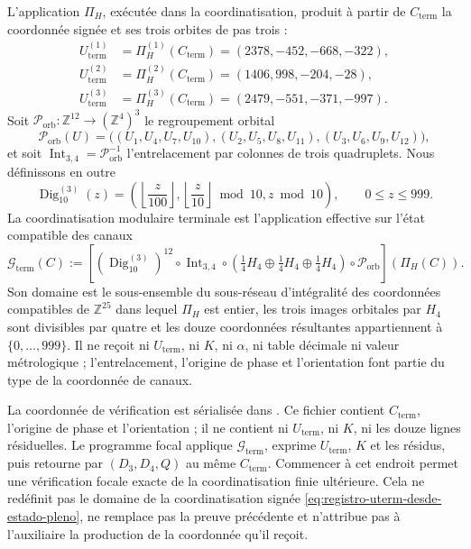 L'application \(\Pi_H\), exécutée dans la coordinatisation, produit à partir de \(C_{\mathrm{term}}\) la coordonnée signée et ses trois orbites de pas trois :
\begin{align*}
 U_{\mathrm{term}}^{(1)}&=\Pi_H^{(1)}(C_{\mathrm{term}})
                         =(2378,-452,-668,-322),\\
 U_{\mathrm{term}}^{(2)}&=\Pi_H^{(2)}(C_{\mathrm{term}})
                         =(1406,998,-204,-28),\\
 U_{\mathrm{term}}^{(3)}&=\Pi_H^{(3)}(C_{\mathrm{term}})
                         =(2479,-551,-371,-997).
\end{align*}
Soit \(\mathcal P_{\mathrm{orb}}:\mathbb Z^{12}\to(\mathbb Z^4)^3\) le
regroupement orbital
\[
 \mathcal P_{\mathrm{orb}}(U)
 =\bigl((U_1,U_4,U_7,U_{10}),
        (U_2,U_5,U_8,U_{11}),
        (U_3,U_6,U_9,U_{12})\bigr),
\]
et soit \(\operatorname{Int}_{3,4}=\mathcal P_{\mathrm{orb}}^{-1}\)
l’entrelacement par colonnes de trois quadruplets. Nous définissons en outre
\[
 \operatorname{Dig}_{10}^{(3)}(z)
 =\left(\left\lfloor\frac z{100}\right\rfloor,
         \left\lfloor\frac z{10}\right\rfloor\bmod10,
         z\bmod10\right),\qquad0\le z\le999.
\]
La coordinatisation modulaire terminale est l'application effective sur l'état compatible des canaux
\begin{equation}
 \mathcal G_{\mathrm{term}}(C)
 :=\left[(\operatorname{Dig}_{10}^{(3)})^{12}
 \circ\operatorname{Int}_{3,4}
 \circ\left(\tfrac14H_4\oplus\tfrac14H_4
                    \oplus\tfrac14H_4\right)
  \circ\mathcal P_{\mathrm{orb}}\right]\!\left(\Pi_H(C)\right).
 \label{eq:registro-generador-modular-terminal}
\end{equation}
Son domaine est le sous-ensemble du sous-réseau d’intégralité des coordonnées
compatibles de \(\mathbb Z^{25}\)
dans lequel \(\Pi_H\) est entier, les trois images orbitales par \(H_4\) sont
divisibles par quatre et les douze coordonnées résultantes appartiennent à
\(\{0,\ldots,999\}\). Il ne reçoit ni \(U_{\mathrm{term}}\), ni \(K\), ni \(\alpha\),
ni table décimale ni valeur métrologique ; l’entrelacement, l’origine de phase
et l’orientation font partie du type de la coordonnée de canaux.

La coordonnée de vérification est sérialisée dans . Ce fichier contient \(C_{\mathrm{term}}\), l'origine de phase et l'orientation ; il ne contient ni \(U_{\mathrm{term}}\), ni \(K\), ni les douze lignes résiduelles. Le programme focal applique \(\mathcal G_{\mathrm{term}}\), exprime \(U_{\mathrm{term}}\), \(K\) et les résidus, puis retourne par \((D_3,D_4,Q)\) au même \(C_{\mathrm{term}}\). Commencer à cet endroit permet une vérification focale exacte de la coordinatisation finie ultérieure. Cela ne redéfinit pas le domaine de la coordinatisation signée \eqref{eq:registro-uterm-desde-estado-pleno}, ne remplace pas la preuve précédente et n'attribue pas à l'auxiliaire la production de la coordonnée qu'il reçoit.

